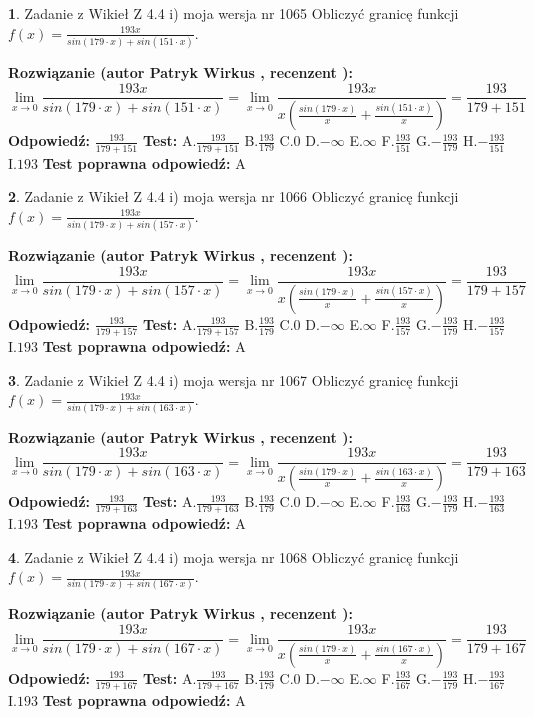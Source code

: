 \documentclass[12pt, a4paper]{article}
\theoremstyle{definition} %
\newtheorem{zad}{}
\newcommand{\zadStart}[1]{\begin{zad}#1\newline}
\newcommand{\zadStop}{\end{zad}}
\newcommand{\rozwStart}[2]{\noindent \textbf{Rozwiązanie (autor #1 , recenzent #2): }\newline}
\newcommand{\rozwStop}{\newline}
\newcommand{\odpStart}{\noindent \textbf{Odpowiedź:}\newline}
\newcommand{\odpStop}{\newline}
\newcommand{\testStart}{\noindent \textbf{Test:}\newline}
\newcommand{\testStop}{\newline}
\newcommand{\kluczStart}{\noindent \textbf{Test poprawna odpowiedź:}\newline}
\newcommand{\kluczStop}{\newline}
\begin{document}
\zadStart{Zadanie z Wikieł Z 4.4 i) moja wersja nr 1065}
Obliczyć granicę funkcji $f(x)=\frac{193x}{sin(179\cdot x) +sin(151\cdot x)}$.
\zadStop
\rozwStart{Patryk Wirkus}{}
$$\lim\limits_{x\to 0}\frac{193x}{sin(179\cdot x) +sin(151\cdot x)}=\lim\limits_{x\to 0}\frac{193x}{x(\frac{sin(179\cdot x)}{x}+\frac{sin(151\cdot x)}{x})}=\frac{193}{179+151}$$
\rozwStop
\odpStart
$\frac{193}{179+151}$
\odpStop
\testStart
A.$\frac{193}{179+151}$
B.$\frac{193}{179}$
C.$0$
D.$-\infty$
E.$\infty$
F.$\frac{193}{151}$
G.$-\frac{193}{179}$
H.$-\frac{193}{151}$
I.$193$
\testStop
\kluczStart
A
\kluczStop



\zadStart{Zadanie z Wikieł Z 4.4 i) moja wersja nr 1066}
Obliczyć granicę funkcji $f(x)=\frac{193x}{sin(179\cdot x) +sin(157\cdot x)}$.
\zadStop
\rozwStart{Patryk Wirkus}{}
$$\lim\limits_{x\to 0}\frac{193x}{sin(179\cdot x) +sin(157\cdot x)}=\lim\limits_{x\to 0}\frac{193x}{x(\frac{sin(179\cdot x)}{x}+\frac{sin(157\cdot x)}{x})}=\frac{193}{179+157}$$
\rozwStop
\odpStart
$\frac{193}{179+157}$
\odpStop
\testStart
A.$\frac{193}{179+157}$
B.$\frac{193}{179}$
C.$0$
D.$-\infty$
E.$\infty$
F.$\frac{193}{157}$
G.$-\frac{193}{179}$
H.$-\frac{193}{157}$
I.$193$
\testStop
\kluczStart
A
\kluczStop



\zadStart{Zadanie z Wikieł Z 4.4 i) moja wersja nr 1067}
Obliczyć granicę funkcji $f(x)=\frac{193x}{sin(179\cdot x) +sin(163\cdot x)}$.
\zadStop
\rozwStart{Patryk Wirkus}{}
$$\lim\limits_{x\to 0}\frac{193x}{sin(179\cdot x) +sin(163\cdot x)}=\lim\limits_{x\to 0}\frac{193x}{x(\frac{sin(179\cdot x)}{x}+\frac{sin(163\cdot x)}{x})}=\frac{193}{179+163}$$
\rozwStop
\odpStart
$\frac{193}{179+163}$
\odpStop
\testStart
A.$\frac{193}{179+163}$
B.$\frac{193}{179}$
C.$0$
D.$-\infty$
E.$\infty$
F.$\frac{193}{163}$
G.$-\frac{193}{179}$
H.$-\frac{193}{163}$
I.$193$
\testStop
\kluczStart
A
\kluczStop



\zadStart{Zadanie z Wikieł Z 4.4 i) moja wersja nr 1068}
Obliczyć granicę funkcji $f(x)=\frac{193x}{sin(179\cdot x) +sin(167\cdot x)}$.
\zadStop
\rozwStart{Patryk Wirkus}{}
$$\lim\limits_{x\to 0}\frac{193x}{sin(179\cdot x) +sin(167\cdot x)}=\lim\limits_{x\to 0}\frac{193x}{x(\frac{sin(179\cdot x)}{x}+\frac{sin(167\cdot x)}{x})}=\frac{193}{179+167}$$
\rozwStop
\odpStart
$\frac{193}{179+167}$
\odpStop
\testStart
A.$\frac{193}{179+167}$
B.$\frac{193}{179}$
C.$0$
D.$-\infty$
E.$\infty$
F.$\frac{193}{167}$
G.$-\frac{193}{179}$
H.$-\frac{193}{167}$
I.$193$
\testStop
\kluczStart
A
\kluczStop
\end{document}
